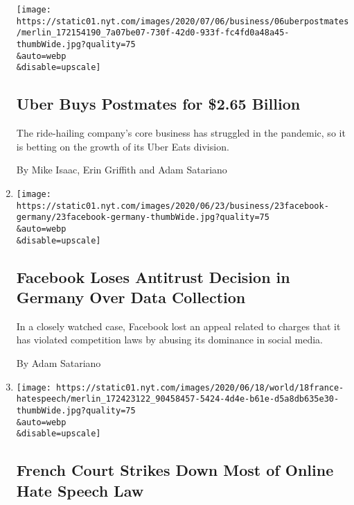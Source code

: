 \begin{enumerate}
  \texttt{[image: https://static01.nyt.com/images/2020/07/06/business/06uberpostmates/merlin\_172154190\_7a07be07-730f-42d0-933f-fc4fd0a48a45-thumbWide.jpg?quality=75\\\&auto=webp\\\&disable=upscale]}

  \hypertarget{uber-buys-postmates-for-265-billion}{%
  \subsection{Uber Buys Postmates for \$2.65
  Billion}\label{uber-buys-postmates-for-265-billion}}

  The ride-hailing company's core business has struggled in the
  pandemic, so it is betting on the growth of its Uber Eats division.

  By Mike Isaac, Erin Griffith and Adam Satariano
\item
  \href{/2020/06/23/technology/facebook-antitrust-germany.html}{}

  \texttt{[image: https://static01.nyt.com/images/2020/06/23/business/23facebook-germany/23facebook-germany-thumbWide.jpg?quality=75\\\&auto=webp\\\&disable=upscale]}

  \hypertarget{facebook-loses-antitrust-decision-in-germany-over-data-collection}{%
  \subsection{Facebook Loses Antitrust Decision in Germany Over Data
  Collection}\label{facebook-loses-antitrust-decision-in-germany-over-data-collection}}

  In a closely watched case, Facebook lost an appeal related to charges
  that it has violated competition laws by abusing its dominance in
  social media.

  By Adam Satariano
\item
  \href{/2020/06/18/world/europe/france-internet-hate-speech-regulation.html}{}

  \texttt{[image: https://static01.nyt.com/images/2020/06/18/world/18france-hatespeech/merlin\_172423122\_90458457-5424-4d4e-b61e-d5a8db635e30-thumbWide.jpg?quality=75\\\&auto=webp\\\&disable=upscale]}

  \hypertarget{french-court-strikes-down-most-of-online-hate-speech-law}{%
  \subsection{French Court Strikes Down Most of Online Hate Speech
  Law}\label{french-court-strikes-down-most-of-online-hate-speech-law}}


\end{enumerate}
